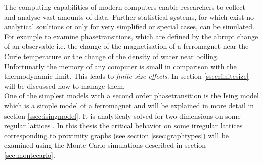 The computing capabilities of modern computers enable researchers to
collect and analyse vast amounts of data.
Further statistical systems, for which exist no analytical soultions
or only for very simplified or special cases, can be simulated.
For example to examine phasetransitions, which are defined by the abrupt
change of an observable i.e. the change of the magnetisation of a
ferromagnet near the Curie temperature or the change of the density of
water near boiling. Unfortunatly the memory of any computer is small in
comparison with the thermodynamic limit.
This leads to \emph{finite size effects}. In section \ref{ssec:finitesize}
will be discussed how to manage them.\\

One of the simplest models with a second order phasetransition is the
Ising model \cite{Ising1925} which is a simple model of a ferromagnet
and will be explained in more detail in section \ref{ssec:isingmodel}.
It is analyticaly solved for two dimensions on some regular lattices
\cite{Onsager1944} \cite{Wannier1945}.
In this thesis the critical behavior on some irregular lattices
corresponding to proximity graphs (see section \ref{ssec:graphtypes})
will be examined using the Monte Carlo simulations described in section
\ref{sec:montecarlo}.
